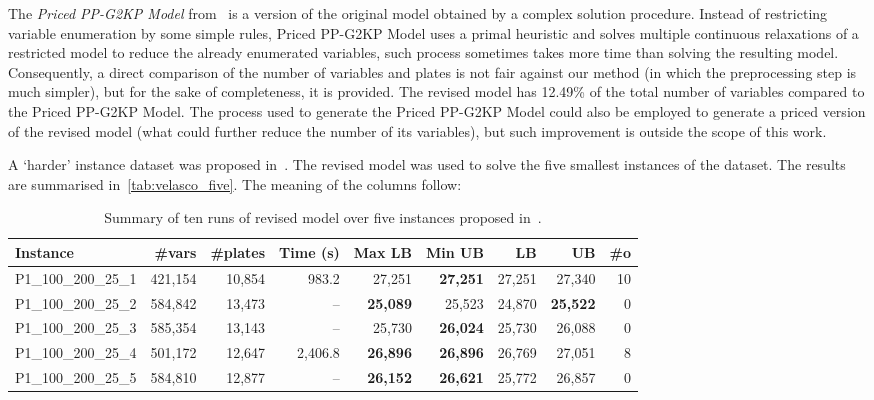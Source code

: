 \documentclass[smallextended]{svjour3}       %
\begin{document}
The \emph{Priced PP-G2KP Model} from~\cite{furini:2016} is a version of the original model obtained by a complex solution procedure.
Instead of restricting variable enumeration by some simple rules, Priced PP-G2KP Model uses a primal heuristic and solves multiple continuous relaxations of a restricted model to reduce the already enumerated variables, such process sometimes takes more time than solving the resulting model.
Consequently, a direct comparison of the number of variables and plates is not fair against our method (in which the preprocessing step is much simpler), but for the sake of completeness, it is provided.
The revised model has 12.49\% of the total number of variables compared to the Priced PP-G2KP Model.
The process used to generate the Priced PP-G2KP Model could also be employed to generate a priced version of the revised model (what could further reduce the number of its variables), but such improvement is outside the scope of this work.

A `harder' instance dataset was proposed in~\cite{velasco:2019}.
The revised model was used to solve the five smallest instances of the dataset.
The results are summarised in~\autoref{tab:velasco_five}. The meaning of the columns follow:

\begin{table}
\caption{Summary of ten runs of revised model over five instances proposed in~\cite{velasco:2019}.}
\setlength\tabcolsep{2.5px}
\begin{tabular}{lrrrrrrrr}
Instance & \#vars & \#plates & Time (s)& Max LB & Min UB & \cite{velasco:2019} LB & \cite{velasco:2019} UB & \#o\\
\hline
P1\_100\_200\_25\_1 & 421,154 & 10,854 & 983.2 & 27,251 & \bf{27,251} & 27,251 & 27,340 & 10 \\
P1\_100\_200\_25\_2 & 584,842 & 13,473 & -- & \bf{25,089} & 25,523 & 24,870 & \bf{25,522} & 0 \\
P1\_100\_200\_25\_3 & 585,354 & 13,143 & -- & 25,730 & \bf{26,024} & 25,730 & 26,088 & 0 \\
P1\_100\_200\_25\_4 & 501,172 & 12,647 & 2,406.8 & \bf{26,896} & \bf{26,896} & 26,769 & 27,051 & 8 \\
P1\_100\_200\_25\_5 & 584,810 & 12,877 & -- & \bf{26,152} & \bf{26,621} & 25,772 & 26,857 & 0 \\
\hline
\end{tabular}
\label{tab:velasco_five}
\end{table}
\end{document}
